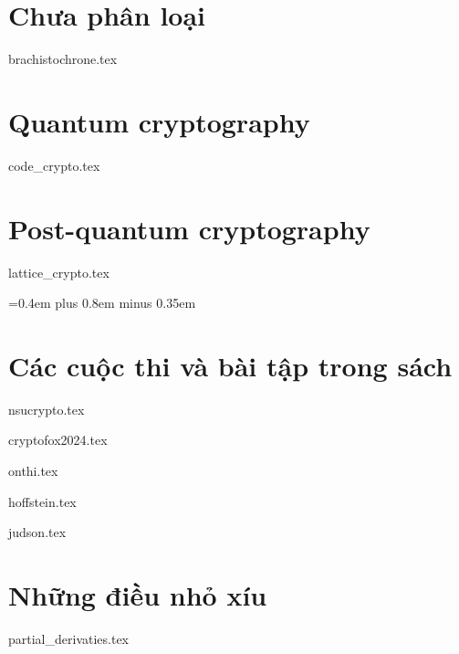 \documentclass{mynotes}
\begin{document}
\part{Chưa phân loại}





{brachistochrone.tex}



\part{Quantum cryptography}

\parttoc



{code_crypto.tex}

\part{Post-quantum cryptography}

\parttoc

{lattice_crypto.tex}

{
 \spaceskip=0.4em plus 0.8em minus 0.35em
\printbibliography[env=gostbibliography,heading=bibintoc,title={Tài liệu tham khảo}]
}


\part{Các cuộc thi và bài tập trong sách}

\parttoc

{nsucrypto.tex}

{cryptofox2024.tex}

{onthi.tex}

{hoffstein.tex}

{judson.tex}

\part{Những điều nhỏ xíu}

\parttoc

{partial_derivaties.tex}
\end{document}
